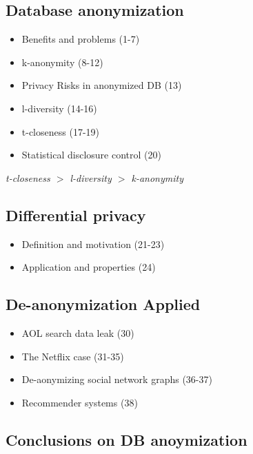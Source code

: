 \documentclass[../overview.tex]{subfiles}
\begin{document}
\subsection{Database anonymization}
\begin{itemize}
	\item Benefits and problems (1-7)
	\item k-anonymity (8-12)
	\item Privacy Risks in anonymized DB (13)
	\item l-diversity (14-16)
	\item t-closeness (17-19)
	\item Statistical disclosure control (20)
\end{itemize}
\emph{t-closeness $>$ l-diversity $>$ k-anonymity}

\subsection{Differential privacy}
\begin{itemize}
		\item Definition and motivation (21-23)
		\item Application and properties (24)
\end{itemize}

\subsection{De-anonymization Applied}
\begin{itemize}
		\item AOL search data leak (30)
		\item The Netflix case (31-35)
		\item De-aonymizing social network graphs (36-37)
		\item Recommender systems (38)
\end{itemize}
\subsection{Conclusions on DB anoymization}
\end{document}
